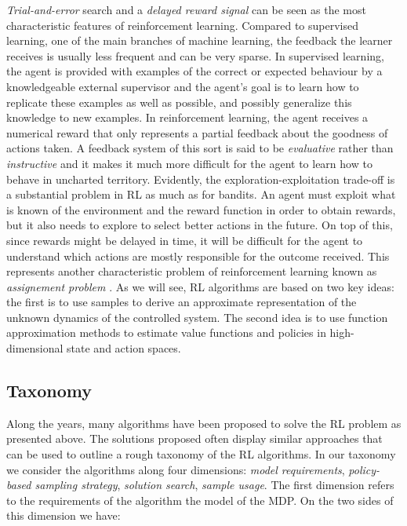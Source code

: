\emph{Trial-and-error} search and a \emph{delayed reward signal} can be
seen as the most characteristic features of reinforcement learning. Compared to supervised learning, one of the main branches of machine learning, the feedback the learner receives is usually less frequent and can be very sparse. In supervised learning, the agent is provided with examples of the correct or expected behaviour by a knowledgeable external supervisor and the agent’s goal is to learn how to replicate these examples as well as possible, and possibly generalize this knowledge to new examples. In reinforcement learning, the agent receives a numerical reward that only represents a partial feedback about the goodness of actions taken. A feedback system of this sort is said to be \emph{evaluative} rather than \emph{instructive} and it makes it much more difficult for the agent to learn how to behave in uncharted territory.
Evidently, the exploration-exploitation trade-off is a substantial problem in \gls{RL} as much as for bandits. An agent must exploit what
is known of the environment and the reward function in order to obtain rewards, but it also needs to explore to select better actions in the future. On top of this, since rewards might be delayed in time, it will be difficult for the agent to understand which actions are mostly responsible for the outcome received. This represents another characteristic problem of reinforcement learning known as \emph{assignement problem} \cite{sutton2018reinforcement}. As we will see, \gls{RL} algorithms are based on two key ideas: the first is to use samples to derive an approximate representation of the unknown dynamics of the controlled system. The second idea is to use function approximation methods to estimate value functions and policies in high-dimensional state and action spaces.

\subsection{Taxonomy}
Along the years, many algorithms have been proposed to solve the \gls{RL} problem as presented above. The solutions proposed often display similar approaches that can be used to outline a rough taxonomy of the \gls{RL} algorithms. In our taxonomy we consider the algorithms along four dimensions: \emph{model requirements}, \emph{policy-based sampling strategy}, \emph{solution search}, \emph{sample usage}.
The first dimension refers to the requirements of the algorithm \wrt the model of the \gls{MDP}. On the two sides of this dimension we have:

